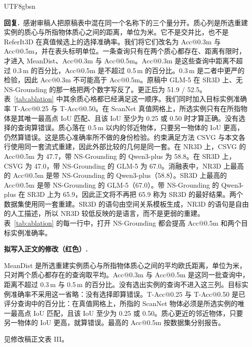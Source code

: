 \documentclass[11pt]{article}
\newcommand{\revresponse}[1]{%
  \par\noindent\textbf{回复.}\ #1\par\vspace{0.3em}}
\newcommand{\revchange}[1]{%
  \par\noindent\textbf{拟写入正文的修改（红色）.}\par
  \noindent\textcolor{revred}{#1}\par\vspace{0.8em}}
\begin{document}
\begin{CJK*}{UTF8}{gbsn}
\revresponse{感谢审稿人把原稿表中混在同一个名称下的三个量分开。质心列是所选重建实例的质心与所指物体质心之间的距离，单位为米。它不是交并比，也不是 ReferIt3D 在真值候选上的选择准确率。我们将它们改名为 Acc@0.3m 与 Acc@0.5m，并在表头标明单位。一条查询只有在两个质心都存在、距离有限时，才进入 MeanDist、Acc@0.3m 与 Acc@0.5m。Acc@0.3m 是这些查询中距离不超过 0.3\,m 的百分比，Acc@0.5m 是不超过 0.5\,m 的百分比。0.3\,m 是二者中更严的检验，因此 Acc@0.3m 不可能高于 Acc@0.5m。原稿中 GLM-5 在 SR3D 上、无 NS-Grounding 的那一格把两个数字写反了。更正后为 51.9 / 52.5。表~\ref{tab:ablation} 中其余质心格都已经满足这一顺序。我们同时加入目标实例准确率 T-Acc@0.25 与 T-Acc@0.50。在 ScanNet 真值网格上，所选实例只有在所指物体是其唯一最高点 IoU 匹配、且该 IoU 至少为 0.25 或 0.50 时才算正确。没有选择的查询算错误。质心落在 0.5\,m 以内的邻近物体，只要另一物体的 IoU 更高，仍然算错误。这是质心准确率所不做的身份检验。约束满足方法 CSVG 与本文各行使用同一套流式重建，因此外部比较的几何是同一套。在 NR3D 上，CSVG 的 Acc@0.5m 为 47.7，带 NS-Grounding 的 Qwen3-plus 为 58.8。在 SR3D 上，CSVG 为 47.0，带 NS-Grounding 的 GLM-5 为 67.0。消融表中，NR3D 上最高的 Acc@0.5m 是带 NS-Grounding 的 Qwen3-plus（58.8）。SR3D 上最高的 Acc@0.5m 是带 NS-Grounding 的 GLM-5（67.0）。带 NS-Grounding 的 Qwen3-plus 在 SR3D 上为 65.9，因此正文将不再把 65.9 称为 SR3D 的最好结果。两个数据集使用同一套重建。SR3D 的语句由空间关系模板生成，NR3D 的语句是自由的人工描述，所以 NR3D 较低反映的是语言，而不是更弱的重建。表~\ref{tab:ablation} 的每一行中，打开 NS-Grounding 都会提高 Acc@0.5m 和两个目标实例准确率。}

\revchange{MeanDist 是所选重建实例质心与所指物体质心之间的平均欧氏距离，单位为米，只对两个质心都存在的查询取平均。Acc@0.3m 与 Acc@0.5m 是这同一批查询中，距离不超过 0.3\,m 与 0.5\,m 的百分比。没有选出实例的查询不进入这三列。目标实例准确率不采用这一省略：没有选择即算错误。T-Acc@0.25 与 T-Acc@0.50 是已评分查询中的百分比：在真值网格上，所指的 ScanNet 物体必须是所选实例的唯一最高点 IoU 匹配，且该 IoU 至少为 0.25 或 0.50。质心更近的邻近物体，只要另一物体的 IoU 更高，就算错误。最高的 Acc@0.5m 按数据集分别报告。}

\noindent 见修改稿正文表 III。


\end{CJK*}
\end{document}
